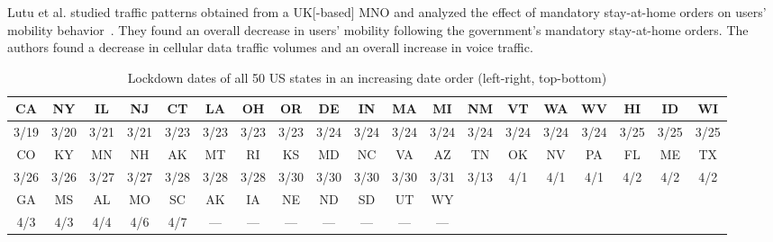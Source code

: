 \documentclass[conference,10pt]{IEEEtran}
\begin{document}


Lutu et al. studied traffic patterns obtained from a \gls{UK}[-based] \gls{MNO} and analyzed the effect of mandatory stay-at-home orders on users' mobility behavior~\cite{lutu2020characterization}. They found an overall decrease in users' mobility following the government’s mandatory stay-at-home orders. The authors found a decrease in cellular data traffic volumes and an overall increase in voice traffic.

\begin{table}
  \centering
  \caption{Lockdown dates of all 50 \gls{US} states in an increasing date order (left-right, top-bottom)}
  \label{tab:state-lockdown}
  \begin{tabular}{ |c|c|c|c|c|c|c|c|c|c|c|c|c|c|c|c|c|c|c| }
    \hline
    CA   & NY   & IL   & NJ   & CT   & LA   & OH   & OR   & DE   & IN   & MA   & MI   & NM   & VT   & WA   & WV   & HI   & ID   & WI   \\
    \hline
    3/19 & 3/20 & 3/21 & 3/21 & 3/23 & 3/23 & 3/23 & 3/23 & 3/24 & 3/24 & 3/24 & 3/24 & 3/24 & 3/24 & 3/24 & 3/24 & 3/25 & 3/25 & 3/25 \\
    \hline\hline
    CO   & KY   & MN   & NH   & AK   & MT   & RI   & KS   & MD   & NC   & VA   & AZ   & TN   & OK   & NV   & PA   & FL   & ME   & TX   \\
    \hline
    3/26 & 3/26 & 3/27 & 3/27 & 3/28 & 3/28 & 3/28 & 3/30 & 3/30 & 3/30 & 3/30 & 3/31 & 3/13 & 4/1  & 4/1  & 4/1  & 4/2  & 4/2  & 4/2  \\
    \hline\hline
    GA   & MS   & AL   & MO   & SC   & AK   & IA   & NE   & ND   & SD   & UT   & WY   & \multicolumn{7}{|c|}{}                         \\
    \hline
    4/3  & 4/3  & 4/4  & 4/6  & 4/7  & ---  & ---  & ---  & ---  & ---  & ---  & ---  & \multicolumn{7}{|c|}{}                         \\
    \hline
  \end{tabular}
\end{table}
\end{document}
